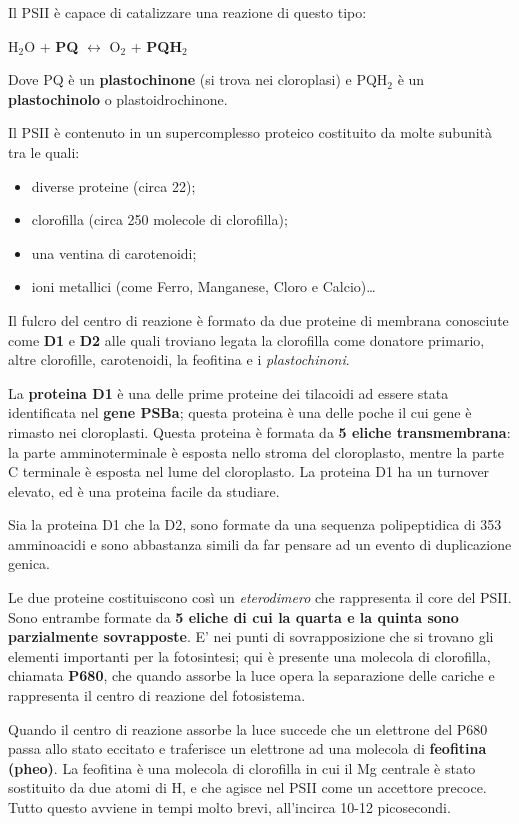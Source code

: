 \documentclass[]{article}
\begin{document}
Il PSII è capace di catalizzare una reazione di questo tipo:

H$_2$O + \textbf{PQ} $\leftrightarrow$ O$_2$ + \textbf{PQH$_2$}

Dove PQ è un \textbf{plastochinone} (si trova nei cloroplasi) e PQH$_2$
è un \textbf{plastochinolo} o plastoidrochinone.

Il PSII è contenuto in un supercomplesso proteico costituito da molte
subunità tra le quali:

\begin{itemize}
\itemsep1pt\parskip0pt
\item
  diverse proteine (circa 22);
\item
  clorofilla (circa 250 molecole di clorofilla);
\item
  una ventina di carotenoidi;
\item
  ioni metallici (come Ferro, Manganese, Cloro e Calcio)\ldots{}
\end{itemize}

Il fulcro del centro di reazione è formato da due proteine di membrana
conosciute come \textbf{D1} e \textbf{D2} alle quali troviano legata la
clorofilla come donatore primario, altre clorofille, carotenoidi, la
feofitina e i \emph{plastochinoni}.

La \textbf{proteina D1} è una delle prime proteine dei tilacoidi ad
essere stata identificata nel \textbf{gene PSBa}; questa proteina è una
delle poche il cui gene è rimasto nei cloroplasti. Questa proteina è
formata da \textbf{5 eliche transmembrana}: la parte amminoterminale è
esposta nello stroma del cloroplasto, mentre la parte C terminale è
esposta nel lume del cloroplasto. La proteina D1 ha un turnover elevato,
ed è una proteina facile da studiare.

Sia la proteina D1 che la D2, sono formate da una sequenza polipeptidica
di 353 amminoacidi e sono abbastanza simili da far pensare ad un evento
di duplicazione genica.

Le due proteine costituiscono così un \emph{eterodimero} che rappresenta
il core del PSII. Sono entrambe formate da \textbf{5 eliche di cui la
quarta e la quinta sono parzialmente sovrapposte}. E' nei punti di
sovrapposizione che si trovano gli elementi importanti per la
fotosintesi; qui è presente una molecola di clorofilla, chiamata
\textbf{P680}, che quando assorbe la luce opera la separazione delle
cariche e rappresenta il centro di reazione del fotosistema.

Quando il centro di reazione assorbe la luce succede che un elettrone
del P680 passa allo stato eccitato e traferisce un elettrone ad una
molecola di \textbf{feofitina (pheo)}. La feofitina è una molecola di
clorofilla in cui il Mg centrale è stato sostituito da due atomi di H, e
che agisce nel PSII come un accettore precoce. Tutto questo avviene in
tempi molto brevi, all'incirca 10-12 picosecondi.
\end{document}
